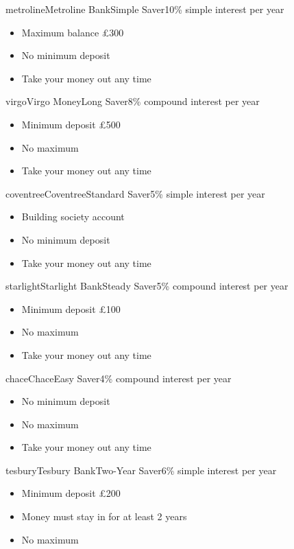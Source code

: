\documentclass[12pt]{article}
\newcommand{\deal}[1]{%
  \begin{itemize}[leftmargin=4mm,itemsep=1.6mm,topsep=0mm,parsep=0mm,label=\textbullet]
  #1
  \end{itemize}}
\begin{document}
\begin{tcbraster}[raster columns=2, raster equal height=rows,
                  raster column skip=5mm, raster row skip=6mm]
\begin{advert}{metroline}{Metroline Bank}{Simple Saver}{10\% simple interest per year}
\deal{
  \item Maximum balance \pounds300
  \item No minimum deposit
  \item Take your money out any time
}
\end{advert}
\begin{advert}{virgo}{Virgo Money}{Long Saver}{8\% compound interest per year}
\deal{
  \item Minimum deposit \pounds500
  \item No maximum
  \item Take your money out any time
}
\end{advert}
\begin{advert}{coventree}{Coventree}{Standard Saver}{5\% simple interest per year}
\deal{
  \item Building society account
  \item No minimum deposit
  \item Take your money out any time
}
\end{advert}
\begin{advert}{starlight}{Starlight Bank}{Steady Saver}{5\% compound interest per year}
\deal{
  \item Minimum deposit \pounds100
  \item No maximum
  \item Take your money out any time
}
\end{advert}
\begin{advert}{chace}{Chace}{Easy Saver}{4\% compound interest per year}
\deal{
  \item No minimum deposit
  \item No maximum
  \item Take your money out any time
}
\end{advert}
\begin{advert}{tesbury}{Tesbury Bank}{Two-Year Saver}{6\% simple interest per year}
\deal{
  \item Minimum deposit \pounds200
  \item Money must stay in for at least 2 years
  \item No maximum
}
\end{advert}
\end{tcbraster}
\end{document}
